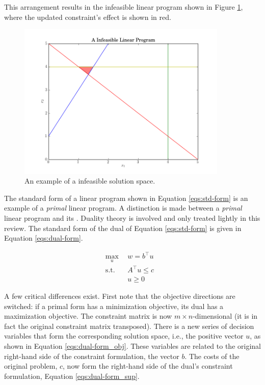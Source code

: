 This arrangement results in the infeasible linear program shown in
Figure \ref{fig:infeasible}, where the updated constraint's effect is shown in
red.

\begin{figure}[H]
  \begin{center}
    \includegraphics[height=7.5cm]{./chapters/litreview/plots/infeasible.png}
  \caption{An example of a infeasible solution space.}
  \label{fig:infeasible}
  \end{center}
\end{figure}

The standard form of a linear program shown in Equation \ref{eqs:std-form} is an
example of a \textit{primal} linear program. A distinction is made between
a \textit{primal} linear program and its . Duality theory is involved
and only treated lightly in this review. The standard form of the dual of
Equation \ref{eqs:std-form} is given in Equation \ref{eqs:dual-form}.

\begin{subequations}\label{eqs:dual-form}
  \begin{align}
    \max_{u} \:\: & 
    w = b^{\top} u
    & \label{eqs:dual-form_obj} \\
    \text{s.t.} \:\: &
    A^{\top} u \leq c 
    & \label{eqs:dual-form_sup} \\
    &
    u \geq 0
    &\label{eqs:dual-form_x}
  \end{align}
\end{subequations}

A few critical differences exist. First note that the objective directions are
switched: if a primal form has a minimization objective, its dual has a
maximization objective. The constraint matrix is now $m \times n$-dimensional
(it is in fact the original constraint matrix transposed). There is a new series
of decision variables that form the corresponding solution space, i.e., the
positive vector $u$, as shown in Equation \ref{eqs:dual-form_obj}. These
variables are related to the original right-hand side of the constraint
formulation, the vector $b$. The costs of the original problem, $c$, now form
the right-hand side of the dual's constraint formulation,
Equation \ref{eqs:dual-form_sup}.

